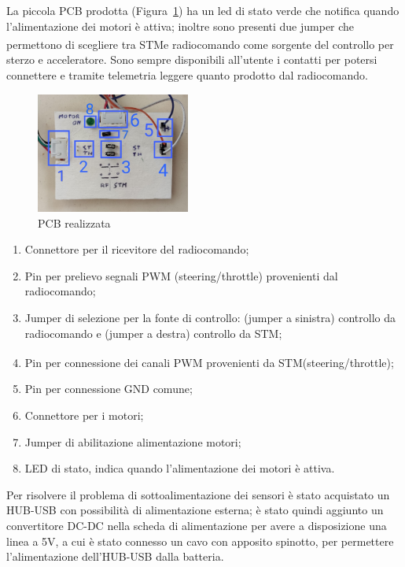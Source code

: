 \bigskip

La piccola PCB prodotta (Figura~\ref{fig:pcb}) ha un led di stato verde che notifica quando l’alimentazione dei motori è attiva; inoltre sono presenti due jumper che permettono di scegliere tra STM\textsuperscript\textregistered e radiocomando come sorgente del controllo per sterzo e acceleratore. Sono sempre disponibili all’utente i contatti per potersi connettere e tramite telemetria leggere quanto prodotto dal radiocomando.

\begin{figure}[h] 
\centering    
\includegraphics[width=0.45\textwidth]{Capitolo1/Figs/pcb.png}
\caption[PCB realizzata]{PCB realizzata}
\label{fig:pcb}
\end{figure}
\begin{enumerate}
    \item Connettore per il ricevitore del radiocomando;
    \item Pin per prelievo segnali PWM (steering/throttle) provenienti dal radiocomando;
    \item Jumper di selezione per la fonte di controllo: (jumper a sinistra) controllo da radiocomando e (jumper a destra) controllo da STM;
	\item Pin per connessione dei canali PWM provenienti da STM\textsuperscript\textregistered\hspace{1mm}(steering/throttle);
    \item Pin per connessione GND comune;
    \item Connettore per i motori;
    \item Jumper di abilitazione alimentazione motori;
    \item LED di stato, indica quando l'alimentazione dei motori è attiva.
\end{enumerate}

Per risolvere il problema di sottoalimentazione dei sensori è stato acquistato un HUB-USB con possibilità di alimentazione esterna; è stato quindi aggiunto un convertitore DC-DC nella scheda di alimentazione per avere a disposizione una linea a 5V, a cui è stato connesso un cavo con apposito spinotto, per permettere l’alimentazione dell’HUB-USB dalla batteria.

